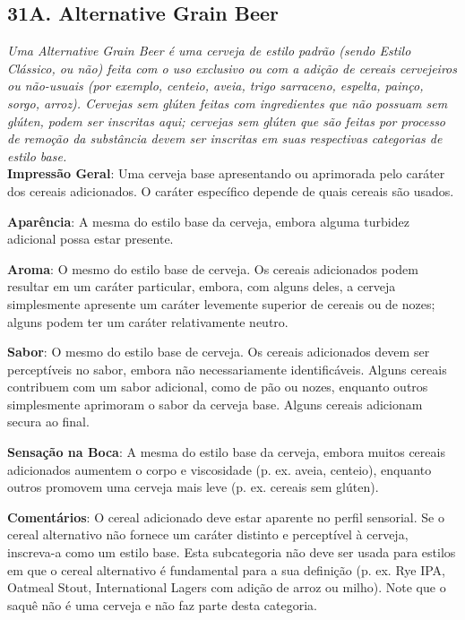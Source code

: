 \subsection*{31A. Alternative Grain Beer}
\textit{Uma Alternative Grain Beer é uma cerveja de estilo padrão (sendo Estilo Clássico, ou não) feita com o uso exclusivo ou com a adição de cereais cervejeiros ou não-usuais (por exemplo, centeio, aveia, trigo sarraceno, espelta, painço, sorgo, arroz). Cervejas sem glúten feitas com ingredientes que não possuam sem glúten, podem ser inscritas aqui; cervejas sem glúten que são feitas por processo de remoção da substância devem ser inscritas em suas respectivas categorias de estilo base.}\\
\textbf{Impressão Geral}: Uma cerveja base apresentando ou aprimorada pelo caráter dos cereais adicionados. O caráter específico depende de quais cereais são usados.

\textbf{Aparência}: A mesma do estilo base da cerveja, embora alguma turbidez adicional possa estar presente.

\textbf{Aroma}: O mesmo do estilo base de cerveja. Os cereais adicionados podem resultar em um caráter particular, embora, com alguns deles, a cerveja simplesmente apresente um caráter levemente superior de cereais ou de nozes; alguns podem ter um caráter relativamente neutro.

\textbf{Sabor}: O mesmo do estilo base de cerveja. Os cereais adicionados devem ser perceptíveis no sabor, embora não necessariamente identificáveis. Alguns cereais contribuem com um sabor adicional, como de pão ou nozes, enquanto outros simplesmente aprimoram o sabor da cerveja base. Alguns cereais adicionam secura ao final.

\textbf{Sensação na Boca}: A mesma do estilo base da cerveja, embora muitos cereais adicionados aumentem o corpo e viscosidade (p. ex. aveia, centeio), enquanto outros promovem uma cerveja mais leve (p. ex. cereais sem glúten).

\textbf{Comentários}: O cereal adicionado deve estar aparente no perfil sensorial. Se o cereal alternativo não fornece um caráter distinto e perceptível à cerveja, inscreva-a como um estilo base. Esta subcategoria não deve ser usada para estilos em que o cereal alternativo é fundamental para a sua definição (p. ex. Rye IPA, Oatmeal Stout, International Lagers com adição de arroz ou milho). Note que o saquê não é uma cerveja e não faz parte desta categoria.

